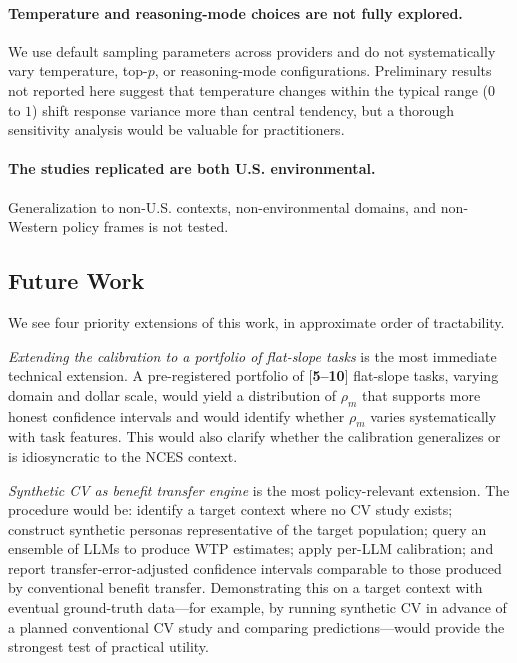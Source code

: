 \documentclass[12pt]{article}
\begin{document}
\paragraph{Temperature and reasoning-mode choices are not fully explored.} We use default sampling parameters across providers and do not systematically vary temperature, top-$p$, or reasoning-mode configurations. Preliminary results not reported here suggest that temperature changes within the typical range ($0$ to $1$) shift response variance more than central tendency, but a thorough sensitivity analysis would be valuable for practitioners.

\paragraph{The studies replicated are both U.S. environmental.} Generalization to non-U.S. contexts, non-environmental domains, and non-Western policy frames is not tested.

\subsection{Future Work}\label{sec:disc-future-work}

We see four priority extensions of this work, in approximate order of tractability.

\textit{Extending the calibration to a portfolio of flat-slope tasks} is the most immediate technical extension. A pre-registered portfolio of [\textbf{5--10}] flat-slope tasks, varying domain and dollar scale, would yield a distribution of $\rho_m$ that supports more honest confidence intervals and would identify whether $\rho_m$ varies systematically with task features. This would also clarify whether the calibration generalizes or is idiosyncratic to the NCES context.

\textit{Synthetic CV as benefit transfer engine} is the most policy-relevant extension. The procedure would be: identify a target context where no CV study exists; construct synthetic personas representative of the target population; query an ensemble of LLMs to produce WTP estimates; apply per-LLM calibration; and report transfer-error-adjusted confidence intervals comparable to those produced by conventional benefit transfer. Demonstrating this on a target context with eventual ground-truth data---for example, by running synthetic CV in advance of a planned conventional CV study and comparing predictions---would provide the strongest test of practical utility.
\end{document}
